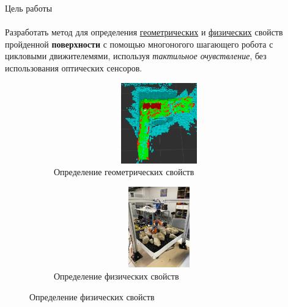 \documentclass[aspectratio=169,xcolor=table]{beamer}
\begin{document}
\begin{frame}[t]{Цель работы}
    \framesubtitle{}
    \vspace{-0.4cm}
    Разработать метод для определения \underline{геометрических} и \underline{физических} свойств пройденной \textbf{поверхности} с помощью многоногого шагающего робота с цикловыми движителемями, используя \textit{тактильное очувствление}, без использования оптических сенсоров.
    \begin{figure}[H]
        \begin{subfigure}{0.49\textwidth}
            \centering\includegraphics[height=3.5cm,width=1\textwidth,keepaspectratio]{conv_concave.png}
            \caption*{Определение геометрических свойств}
        \end{subfigure}
        \begin{subfigure}{0.49\textwidth}
            \centering\includegraphics[height=3.5cm,width=1\textwidth,keepaspectratio]{s_shape_leg/view.jpg}
            \caption*{Определение физических свойств}
            \label{fig:s_shape_leg/view.jpg}
        \end{subfigure}
    \end{figure}
\end{frame}
\end{document}
